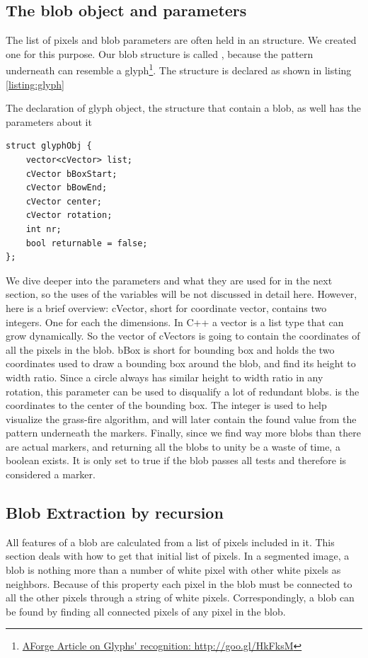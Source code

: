 \subsection{The blob object and parameters}
The list of pixels and blob parameters are often held in an structure.
We created one for this purpose. Our blob structure is called , because the pattern underneath can resemble a glyph\footnote{\url{AForge Article on Glyphs' recognition: http://goo.gl/HkFksM}}. The structure is declared as shown in listing \ref{listing:glyph}
\begin{listing}[H]
	\caption{The declaration of glyph object, the structure that contain a blob, as well has the parameters about it}
	\begin{verbatim}
struct glyphObj {
	vector<cVector> list;
	cVector bBoxStart;
	cVector bBowEnd;
	cVector center;
	cVector rotation;
	int nr;
	bool returnable = false;
};
	\end{verbatim}
	\label{listing:glyph}
\end{listing}
We dive deeper into the parameters and what they are used for in the next section, so the uses of the variables will be not discussed in detail here. However, here is a brief overview:
cVector, short for coordinate vector, contains two integers. One for each the dimensions. In C++ a vector is a list type that can grow dynamically. So the vector of cVectors is going to contain the coordinates of all the pixels in the blob. bBox is short for bounding box and holds the two coordinates used to draw a bounding box around the blob, and find its height to width ratio. Since a circle always has similar height to width ratio in any rotation, this parameter can be used to disqualify a lot of redundant blobs.  is the coordinates to the center of the bounding box.
The integer  is used to help visualize the grass-fire algorithm, and will later contain the found value from the pattern underneath the markers. Finally, since we find way more blobs than there are actual markers, and returning all the blobs to unity be a waste of time, a boolean  exists. It is only set to true if the blob passes all tests and therefore is considered a marker.

\subsection{Blob Extraction by recursion}
All features of a blob are calculated from a list of pixels included in it. This section deals with how to get that initial list of pixels. In a segmented image, a blob is nothing more than a number of white pixel with other white pixels as neighbors. Because of this property each pixel in the blob must be connected to all the other pixels through a string of white pixels. Correspondingly, a blob can be found by finding all connected pixels of any pixel in the blob.\\

